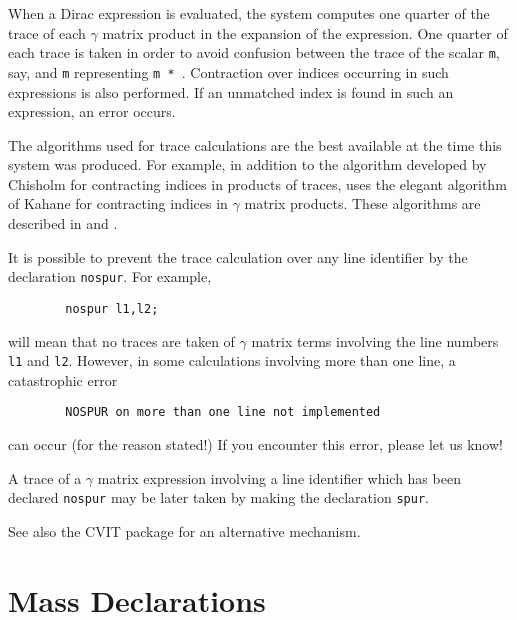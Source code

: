 When a Dirac expression is evaluated, the system computes one quarter of
the trace of each $\gamma$ matrix product in the expansion of the expression.
One quarter of each trace is taken in order to avoid confusion between the
trace of the scalar \texttt{m}, say, and \texttt{m} representing
\texttt{m * }.  
Contraction over indices occurring in such expressions is
also performed.  If an unmatched index is found in such an expression, an
error occurs.

The algorithms used for trace calculations are the best available at the
time this system was produced. For example, in addition to the algorithm
developed by Chisholm for contracting indices in products of traces,
{\REDUCE} uses the elegant algorithm of Kahane for contracting indices in
$\gamma$ matrix products.  These algorithms are described in \cite{Chisholm1963}
and \cite{Kahane:1968}.

It is possible to prevent the trace calculation over any line identifier
by the declaration \texttt{nospur}.  For example,
\begin{verbatim}
        nospur l1,l2;
\end{verbatim}
will mean that no traces are taken of $\gamma$ matrix terms involving the line
numbers \texttt{l1} and \texttt{l2}.  However, in some calculations involving
more than one line, a catastrophic error
\begin{verbatim}
        NOSPUR on more than one line not implemented
\end{verbatim}
can occur (for the reason stated!) If you encounter this error, please let
us know!

A trace of a $\gamma$ matrix expression involving a line identifier which has
been declared \texttt{nospur} may be later taken by making the declaration
\texttt{spur}.

See also the \textsc{CVIT} package for an alternative
mechanism.

\section{Mass Declarations}
\hypertarget{command:MASS}{}
\hypertarget{command:MSHELL}{}

